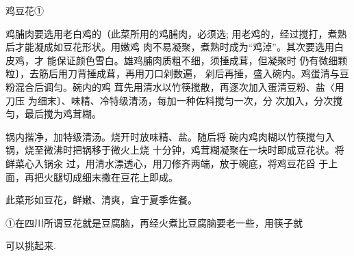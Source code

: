 \begin{recipe}{鸡豆花①}

\ingredients


\cooking

\step 	鸡脯肉要选用老白鸡的（此菜所用的鸡脯肉，必须选; 用老鸡的，经过搅打，煮熟后才能凝成如豆花形状。用嫩鸡 肉不易凝聚，煮熟时成为“鸡淖”。其次要选用白皮鸡，才 能保证颜色雪白。雄鸡脯肉质粗不细，须捶成茸，但凝聚时 仍有微细颗粒〕，去筋后用刀背捶成茸，再用刀口剁数遍， 剁后再捶，盛入碗内。鸡蛋清与豆粉混合后调匀。碗内的鸡 茸先用清水以竹筷搅散，再逐次加入蛋清豆粉、盐〈用刀压 为细末〕、味精、冷特级清汤，每加一种佐料搅匀一次，分 次加入，分次搅匀，最后搅为鸡茸糊。

\step 	锅内揩净，加特级清汤。烧开时放味精、盐。随后将 碗内鸡肉糊以竹筷搅勻入锅，烧至微沸时把锅移于微火上烧 十分钟，鸡茸糊凝聚在一块时即成豆花状。将鲜菜心入锅汆 过，用清水漂透心，用刀修齐两端，放于碗底，将鸡豆花舀 于上面，再把火腿切成细末撒在豆花上即成。

\notes

此菜形如豆花，鲜嫩、清爽，宜于夏季佐餐。

①在四川所谓豆花就是豆腐脑，再经火煮比豆腐脑要老一些，用筷子就

可以挑起来.

\end{recipe}

